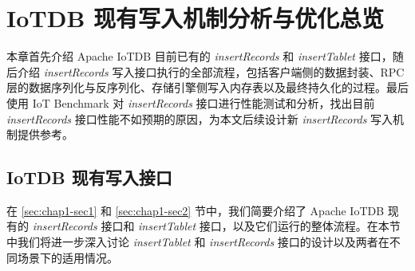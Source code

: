 
\chapter{IoTDB 现有写入机制分析与优化总览}
本章首先介绍 Apache IoTDB 目前已有的 \emph{insertRecords} 和 \emph{insertTablet} 接口，随后介绍 \emph{insertRecords} 写入接口执行的全部流程，包括客户端侧的数据封装、RPC 层的数据序列化与反序列化、存储引擎侧写入内存表以及最终持久化的过程。最后使用 IoT Benchmark 对 \emph{insertRecords} 接口进行性能测试和分析，找出目前 \emph{insertRecords} 接口性能不如预期的原因，为本文后续设计新 \emph{insertRecords} 写入机制提供参考。
\section{IoTDB 现有写入接口}
在 \ref{sec:chap1-sec1} 和 \ref{sec:chap1-sec2} 节中，我们简要介绍了 Apache IoTDB 现有的 \emph{insertRecords} 接口和 \emph{insertTablet} 接口，以及它们运行的整体流程。在本节中我们将进一步深入讨论 \emph{insertTablet} 和 \emph{insertRecords} 接口的设计以及两者在不同场景下的适用情况。

